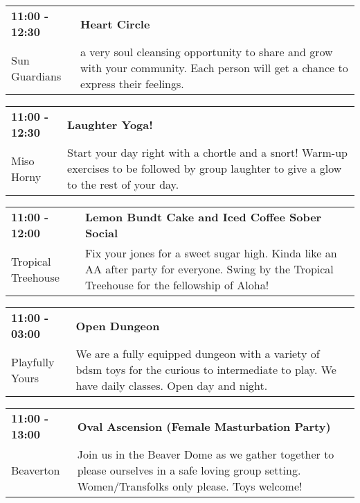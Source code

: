\begin{tabular}{ p{1in} p{2.2in} }
    \textbf{11:00 - 12:30} & \textbf{Heart Circle} \\
    Sun Guardians \newline  & a very soul cleansing opportunity to share and grow with your community. Each person will get a chance to express their feelings. \\
    \hline 
\end{tabular}
    
\begin{tabular}{ p{1in} p{2.2in} }
    \textbf{11:00 - 12:30} & \textbf{Laughter Yoga!} \\
    Miso Horny \newline  & Start your day right with a chortle and a snort! Warm-up exercises to be followed by group laughter to give a glow to the rest of your day. \\
    \hline 
\end{tabular}
    
\begin{tabular}{ p{1in} p{2.2in} }
    \textbf{11:00 - 12:00} & \textbf{Lemon Bundt Cake and Iced Coffee Sober Social} \\
    Tropical Treehouse \newline  & Fix your jones for a sweet sugar high.  Kinda like an AA after party for everyone. Swing by the Tropical Treehouse for the fellowship of Aloha! \\
    \hline 
\end{tabular}
    
\begin{tabular}{ p{1in} p{2.2in} }
    \textbf{11:00 - 03:00} & \textbf{Open Dungeon} \\
    Playfully Yours \newline  & We are a fully equipped dungeon with a variety of bdsm toys for the curious to intermediate to play. We have daily classes. Open day and night. \\
    \hline 
\end{tabular}
    
\begin{tabular}{ p{1in} p{2.2in} }
    \textbf{11:00 - 13:00} & \textbf{Oval Ascension (Female Masturbation Party) } \\
    Beaverton \newline  & Join us in the Beaver Dome as we gather together to please ourselves in a safe loving group setting. Women/Transfolks only please. Toys welcome! \\
    \hline 
\end{tabular}
    

